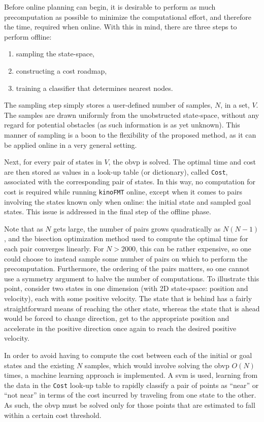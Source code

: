 Before online planning can begin, it is desirable to perform as much precomputation as possible to minimize the computational effort, and therefore the time, required when online. With this in mind, there are three steps to perform offline:
\begin{enumerate}
    \item sampling the state-space,
    \item constructing a cost roadmap,
    \item training a classifier that determines nearest nodes.
\end{enumerate}

The sampling step simply stores a user-defined number of samples, $N$, in a set, $V$. The samples are drawn uniformly from the unobstructed state-space, without any regard for potential obstacles (as such information is as yet unknown). This manner of sampling is a boon to the flexibility of the proposed method, as it can be applied online in a very general setting.

Next, for every pair of states in $V$, the \gls{obvp} is solved. The optimal time and cost are then stored as values in a look-up table (or dictionary), called \texttt{Cost}, associated with the corresponding pair of states. In this way, no computation for cost is required while running \texttt{kinoFMT} online, except when it comes to pairs involving the states known only when online: the initial state and sampled goal states. This issue is addressed in the final step of the offline phase.

Note that as $N$ gets large, the number of pairs grows quadratically as $N(N-1)$, and the bisection optimization method used to compute the optimal time for each pair converges linearly. For $N>2000$, this can be rather expensive, so one could choose to instead sample some number of pairs on which to perform the precomputation. Furthermore, the ordering of the pairs matters, so one cannot use a symmetry argument to halve the number of computations. To illustrate this point, consider two states in one dimension (with 2D state-space: position and velocity), each with some positive velocity. The state that is behind has a fairly straightforward means of reaching the other state, whereas the state that is ahead would be forced to change direction, get to the appropriate position and accelerate in the positive direction once again to reach the desired positive velocity.

In order to avoid having to compute the cost between each of the initial or goal states and the existing $N$ samples, which would involve solving the \gls{obvp} $O(N)$ times, a machine learning approach is implemented. A \gls{svm} is used, learning from the data in the \texttt{Cost} look-up table to rapidly classify a pair of points as ``near'' or ``not near'' in terms of the cost incurred by traveling from one state to the other. As such, the \gls{obvp} must be solved only for those points that are estimated to fall within a certain cost threshold.



